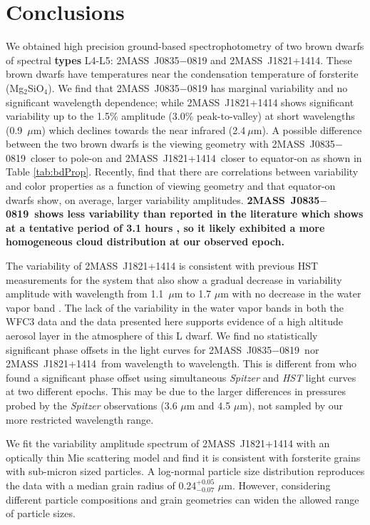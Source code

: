 \documentclass[twocolumn]{aastex6}
\newcommand{\sha}{2MASS~J0835$-$0819}
\newcommand{\shb}{2MASS~J1821+1414}
\begin{document}
\section{Conclusions}\label{sec:conclusions}

We obtained high precision ground-based spectrophotometry of two brown dwarfs of spectral \textbf{types} L4-L5: {\sha} and {\shb}.
These brown dwarfs have temperatures near the condensation temperature of forsterite (Mg$_2$SiO$_4$).
We find that {\sha} has marginal variability and no significant wavelength dependence; while
{\shb} shows significant variability up to the 1.5\% amplitude (3.0\% peak-to-valley) at short wavelengths (0.9~$\mu$m) which declines towards the near infrared (2.4$~\mu$m).
A possible difference between the two brown dwarfs is the viewing geometry with \sha\ closer to pole-on and \shb\ closer to equator-on as shown in Table \ref{tab:bdProp}.
Recently, \citet{vos2017viewingGeom} find that there are correlations between variability and color properties as a function of viewing geometry and that equator-on dwarfs show, on average, larger variability amplitudes.
\textbf{\sha\ shows less variability than reported in the literature which shows at a tentative period of 3.1 hours \citep{2004MNRAS.354..378K,2014A&A...566A.111W}, so it likely exhibited a more homogeneous cloud distribution at our observed epoch.}

The variability of {\shb} is consistent with previous HST measurements for the system that also show a gradual decrease in variability amplitude with wavelength from 1.1~$\mu$m to 1.7 $\mu$m with no decrease in the water vapor band \citep{2016ApJ...826....8Y}.
The lack of the variability in the water vapor bands in both the WFC3 data and the data presented here supports evidence of a high altitude aerosol layer in the atmosphere of this L dwarf.
We find no statistically significant phase offsets in the light curves for \sha\ nor \shb\ from wavelength to wavelength.
This is different from  \citep{2016ApJ...826....8Y} who found a significant phase offset using simultaneous {\em Spitzer} and {\em HST} light curves at two different epochs.
This may be due to the larger differences in pressures probed by the {\em Spitzer} observations (3.6 $\mu$m and 4.5 $\mu$m), not sampled by our more restricted wavelength range.


We fit the variability amplitude spectrum of {\shb} with an optically thin Mie scattering model and find it is consistent with forsterite grains with sub-micron sized particles.
A log-normal particle size distribution reproduces the data with a median grain radius of 0.24$^{+0.05}_{-0.07}$ $\mu$m.
However, considering different particle compositions and grain geometries can widen the allowed range of particle sizes.
\end{document}
